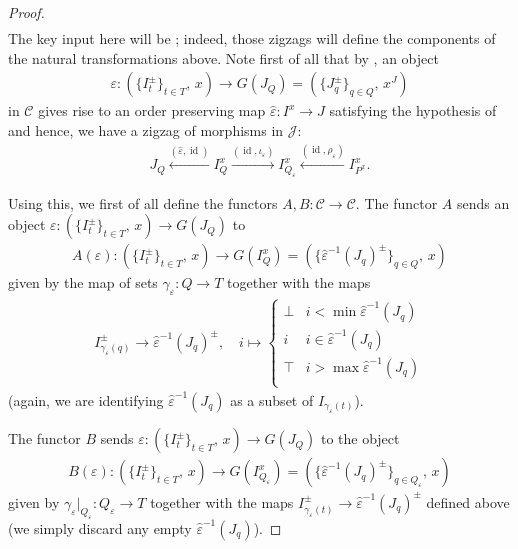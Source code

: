 \documentclass[12pt, reqno]{amsart}
\theoremstyle{plain}
\theoremstyle{definition}
\renewcommand{\epsilon}{\varepsilon}
\begin{document}
\begin{proof}
\begin{align*}
\end{align*}
The key input here will be ; indeed, those zigzags will define the components of the natural transformations above. Note first of all that by , an object
\begin{align*}
\epsilon\colon (\{I_t^\pm\}_{t\in T}, \, x)\longrightarrow G(J_Q)=(\{J_q^\pm \}_{q\in Q}, \, x^J)
\end{align*}
in $\mathcal{C}$ gives rise to an order preserving map $\hat{\epsilon}\colon I^x\rightarrow J$ satisfying the hypothesis of  and hence, we have a zigzag of morphisms in $\mathcal{J}$:
\begin{align*}
J_Q\xleftarrow{(\hat{\epsilon},\operatorname{id})}I^x_Q\xrightarrow{(\operatorname{id},\iota_\epsilon)} I^x_{Q_{\epsilon}}  \xleftarrow{(\operatorname{id},\rho_\epsilon)}I^x_{P^x}.
\end{align*}

Using this, we first of all define the functors $A,B\colon \mathcal{C}\rightarrow \mathcal{C}$. The functor $A$ sends an object $\epsilon\colon (\{I_t^\pm\}_{t\in T}, \, x)\rightarrow G(J_Q)$ to 
\begin{align*}
A(\epsilon)\colon (\{I_t^\pm\}_{t\in T}, \, x)\longrightarrow G(I^x_Q)=(\{\hat{\epsilon}^{-1}(J_q)^\pm\}_{q\in Q},\, x)
\end{align*}
given by the map of sets $\gamma_\epsilon\colon Q\rightarrow T$ together with the maps
\begin{align*}
I_{\gamma_\epsilon(q)}^\pm \rightarrow \hat{\epsilon}^{-1}(J_q)^\pm,\quad i\mapsto \begin{cases}
\bot & i< \min \hat{\epsilon}^{-1}(J_q) \\
i & i\in \hat{\epsilon}^{-1}(J_q) \\
\top & i> \max \hat{\epsilon}^{-1}(J_q)\\
\end{cases}
\end{align*}
(again, we are identifying $\hat{\epsilon}^{-1}(J_q)$ as a subset of $I_{\gamma_\epsilon(t)}$).

The functor $B$ sends $\epsilon\colon (\{I_t^\pm\}_{t\in T}, \, x)\rightarrow G(J_Q)$ to the object
\begin{align*}
B(\epsilon)\colon (\{I_t^\pm\}_{t\in T}, \, x)\longrightarrow G(I^x_{Q_\epsilon})=(\{\hat{\epsilon}^{-1}(J_q)^\pm\}_{q\in Q_\epsilon},\, x)
\end{align*}
given by $\gamma_\epsilon|_{Q_\epsilon}\colon Q_\epsilon\rightarrow T$ together with the maps $I_{\gamma_\epsilon(t)}^\pm\rightarrow \hat{\epsilon}^{-1}(J_q)^\pm$ defined above (we simply discard any empty $\hat{\epsilon}^{-1}(J_q)$).


\end{proof}
\end{document}
